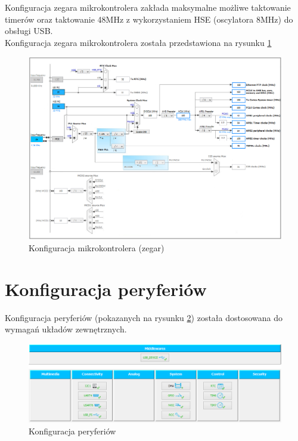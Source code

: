 \documentclass[10pt, a4paper]{article}
\begin{document}
Konfiguracja zegara mikrokontrolera zakłada maksymalne możliwe taktowanie timerów oraz taktowanie 48MHz z wykorzystaniem HSE (oscylatora 8MHz) do obsługi USB.\\
Konfiguracja zegara mikrokontrolera została przedstawiona na rysunku \ref{fig:uCclock}
\begin{figure}[!htb]
\centering
\includegraphics[height=0.43\textheight]{./KonfiguracjaZegara.PNG}
\caption{Konfiguracja mikrokontrolera (zegar) \label{fig:uCclock}}
\end{figure}

\newpage
\section{Konfiguracja peryferiów}
Konfiguracja peryferiów (pokazanych na rysunku \ref{fig:Pery}) została dostosowana do wymagań układów zewnętrznych.
\begin{figure}[!htb]
\centering
\includegraphics[width=\textwidth]{./KonfiguracjaPery.PNG}
\caption{Konfiguracja peryferiów\label{fig:Pery}}
\end{figure}\\
%
\newpage
\end{document}

